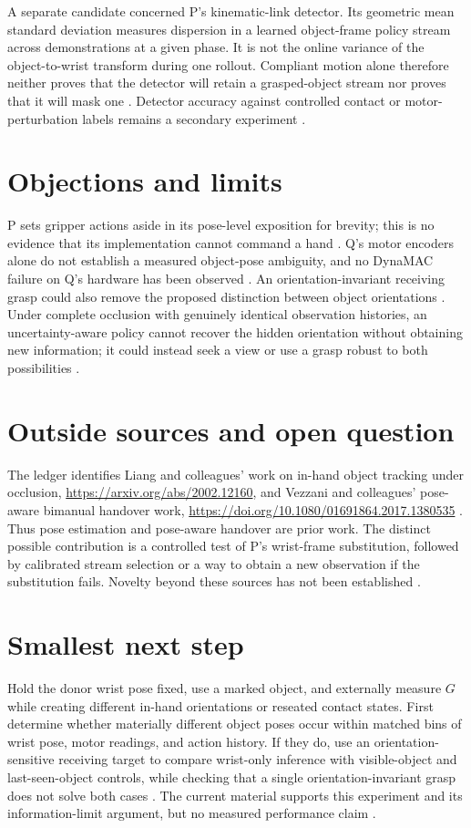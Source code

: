 \documentclass{article}
\begin{document}
A separate candidate concerned P's kinematic-link detector. Its geometric mean standard deviation measures dispersion in a learned object-frame policy stream across demonstrations at a given phase. It is not the online variance of the object-to-wrist transform during one rollout. Compliant motion alone therefore neither proves that the detector will retain a grasped-object stream nor proves that it will mask one . Detector accuracy against controlled contact or motor-perturbation labels remains a secondary experiment .

\section*{Objections and limits}
P sets gripper actions aside in its pose-level exposition for brevity; this is no evidence that its implementation cannot command a hand . Q's motor encoders alone do not establish a measured object-pose ambiguity, and no DynaMAC failure on Q's hardware has been observed . An orientation-invariant receiving grasp could also remove the proposed distinction between object orientations . Under complete occlusion with genuinely identical observation histories, an uncertainty-aware policy cannot recover the hidden orientation without obtaining new information; it could instead seek a view or use a grasp robust to both possibilities .

\section*{Outside sources and open question}
The ledger identifies Liang and colleagues' work on in-hand object tracking under occlusion, \url{https://arxiv.org/abs/2002.12160}, and Vezzani and colleagues' pose-aware bimanual handover work, \url{https://doi.org/10.1080/01691864.2017.1380535} . Thus pose estimation and pose-aware handover are prior work. The distinct possible contribution is a controlled test of P's wrist-frame substitution, followed by calibrated stream selection or a way to obtain a new observation if the substitution fails. Novelty beyond these sources has not been established .

\section*{Smallest next step}
Hold the donor wrist pose fixed, use a marked object, and externally measure \(G\) while creating different in-hand orientations or reseated contact states. First determine whether materially different object poses occur within matched bins of wrist pose, motor readings, and action history. If they do, use an orientation-sensitive receiving target to compare wrist-only inference with visible-object and last-seen-object controls, while checking that a single orientation-invariant grasp does not solve both cases . The current material supports this experiment and its information-limit argument, but no measured performance claim .
\end{document}
